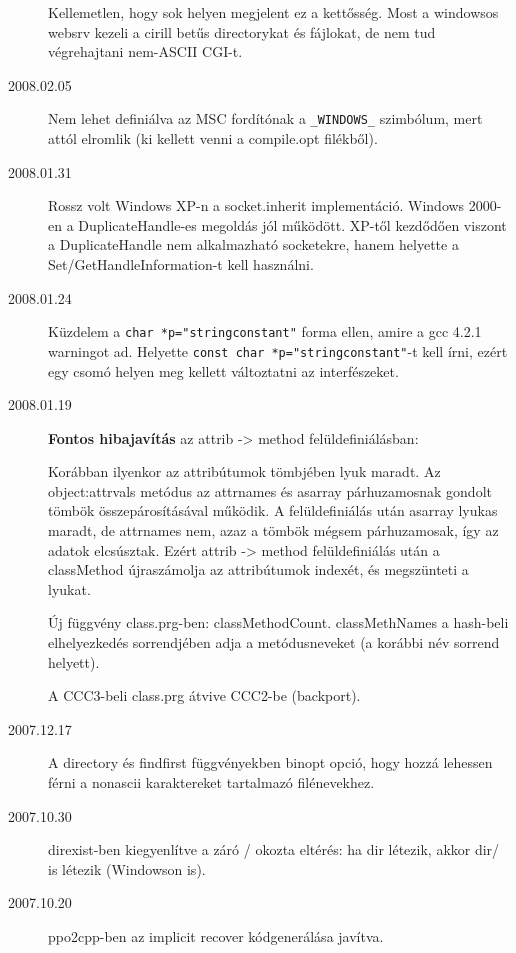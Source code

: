 \begin{description}
  Kellemetlen, hogy sok helyen megjelent ez a kettősség.
  Most a windowsos websrv kezeli a cirill betűs directorykat
  és fájlokat, de nem tud végrehajtani nem-ASCII CGI-t.

\item[2008.02.05]
  Nem lehet definiálva az MSC fordítónak a \verb!_WINDOWS_! szimbólum, 
  mert attól elromlik (ki kellett venni a compile.opt filékből).

\item[2008.01.31]
  Rossz volt Windows XP-n a socket.inherit implementáció.
  Windows 2000-en a DuplicateHandle-es megoldás jól működött.
  XP-től kezdődően viszont a DuplicateHandle nem alkalmazható socketekre,
  hanem helyette a Set/GetHandleInformation-t kell használni.

\item[2008.01.24]
  Küzdelem a \verb!char *p="stringconstant"! forma ellen,
  amire a gcc 4.2.1 warningot ad.
  Helyette \verb!const char *p="stringconstant"!-t kell írni,
  ezért egy csomó helyen meg kellett változtatni az interfészeket.

\item[2008.01.19]
  {\bf Fontos hibajavítás} az attrib -> method felüldefiniálásban:

  Korábban ilyenkor az attribútumok tömbjében lyuk maradt. 
  Az  object:attrvals metódus az attrnames és asarray
  párhuzamosnak gondolt tömbök összepárosításával működik.
  A felüldefiniálás után asarray lyukas maradt, de attrnames nem,
  azaz a tömbök mégsem párhuzamosak, így az adatok elcsúsztak.
  Ezért attrib -> method felüldefiniálás után a classMethod
  újraszámolja az attribútumok indexét, és megszünteti a lyukat.
 
  Új függvény class.prg-ben: classMethodCount.
  classMethNames a hash-beli elhelyezkedés sorrendjében adja
  a metódusneveket (a korábbi név sorrend helyett).
  
  A CCC3-beli class.prg átvive CCC2-be (backport).

\item[2007.12.17]
  A directory és findfirst függvényekben binopt opció,
  hogy hozzá lehessen férni a nonascii karaktereket tartalmazó
  filénevekhez.

\item[2007.10.30]
  direxist-ben kiegyenlítve a záró / okozta eltérés:
  ha dir létezik, akkor dir/ is létezik (Windowson is).

\item[2007.10.20]
  ppo2cpp-ben az implicit recover kódgenerálása javítva.


\end{description}
